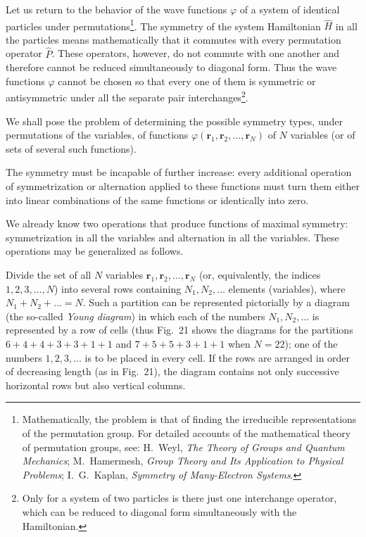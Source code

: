 Let us return to the behavior of the wave functions $\varphi$ of a system of identical particles under permutations\footnote{Mathematically, the problem is that of finding the irreducible representations of the permutation group. For detailed accounts of the mathematical theory of permutation groups, see: H.~Weyl, \emph{The Theory of Groups and Quantum Mechanics}; M.~Hamermesh, \emph{Group Theory and Its Application to Physical Problems}; I.~G.~Kaplan, \emph{Symmetry of Many-Electron Systems}.}. The symmetry of the system Hamiltonian $\widehat H$ in all the particles means mathematically that it commutes with every permutation operator $\widehat P$. These operators, however, do not commute with one another and therefore cannot be reduced simultaneously to diagonal form. Thus the wave functions $\varphi$ cannot be chosen so that every one of them is symmetric or antisymmetric under all the separate pair interchanges\footnote{Only for a system of two particles is there just one interchange operator, which can be reduced to diagonal form simultaneously with the Hamiltonian.}.

We shall pose the problem of determining the possible symmetry types, under permutations of the variables, of functions $\varphi(\mathbf r_1,\mathbf r_2,\ldots,\mathbf r_N)$ of $N$ variables (or of sets of several such functions).

The symmetry must be incapable of further increase: every additional operation of symmetrization or alternation applied to these functions must turn them either into linear combinations of the same functions or identically into zero.

We already know two operations that produce functions of maximal symmetry: symmetrization in all the variables and alternation in all the variables. These operations may be generalized as follows.

Divide the set of all $N$ variables $\mathbf r_1,\mathbf r_2,\ldots,\mathbf r_N$ (or, equivalently, the indices $1,2,3,\ldots,N$) into several rows containing $N_1,N_2,\ldots$ elements (variables), where $N_1+N_2+\ldots=N$. Such a partition can be represented pictorially by a diagram (the so-called \emph{Young diagram}) in which each of the numbers $N_1,N_2,\ldots$ is represented by a row of cells (thus Fig.~21 shows the diagrams for the partitions $6+4+4+3+3+1+1$ and $7+5+5+3+1+1$ when $N=22$); one of the numbers $1,2,3,\ldots$ is to be placed in every cell. If the rows are arranged in order of decreasing length (as in Fig.~21), the diagram contains not only successive horizontal rows but also vertical columns.


